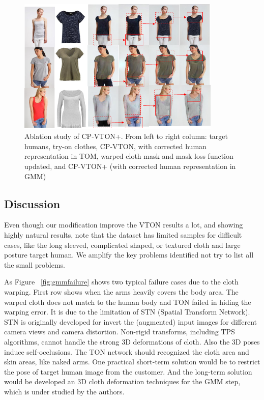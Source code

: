 \begin{figure}
\centering
\includegraphics[height=6.5cm, scale=1]{figures/ablation.png} 
\caption{Ablation study of CP-VTON+. From left to right column: target humans, try-on clothes, CP-VTON, with corrected human representation in TOM, warped cloth mask and mask loss function updated, and CP-VTON+ (with corrected human representation in GMM)
}
\label{fig:ablation}
\end{figure}


\subsection{Discussion}

Even though our modification  improve the VTON results a lot, and showing highly natural results, note that the dataset has limited samples for difficult cases, like the long sleeved, complicated shaped, or textured cloth and large posture target human. We amplify the key problems identified not try to list all the small problems. 

As Figure ~\ref{fig:gmmfailure} shows two typical failure cases due to the cloth warping. First row shows when the arms heavily covers the body area. The warped cloth does not match to the human body and TON failed in hiding the warping error. It is due to the limitation of STN (Spatial Transform Network). STN is originally developed for invert the (augmented) input images for different camera views and camera distortion. Non-rigid transforms, including TPS algorithms, cannot handle the strong 3D deformations of cloth.  Also the 3D poses induce self-occlusions. The TON network should recognized the cloth area and skin areas, like naked arms. One practical short-term solution would be to restrict the pose of target human image from the customer. And the long-term solution would be developed an 3D cloth deformation techniques for the GMM step, which is under studied by the authors. 

